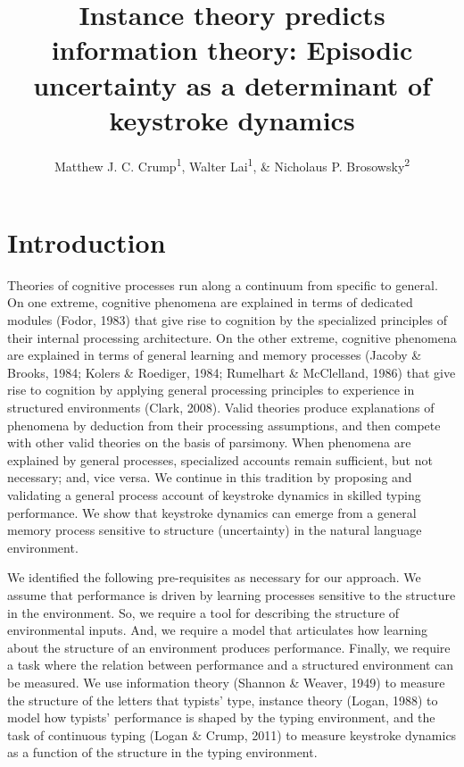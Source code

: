 \documentclass[,man,floatsintext]{apa6}
\title{Instance theory predicts information theory: Episodic uncertainty as a determinant of keystroke dynamics}
\author{Matthew J. C. Crump\textsuperscript{1}, Walter Lai\textsuperscript{1}, \& Nicholaus P. Brosowsky\textsuperscript{2}}
\date{}
\affiliation{
\vspace{0.5cm}
\textsuperscript{1} Brooklyn College of the City University of New York\\\textsuperscript{2} The Graduate Center of the City University of New York}
\begin{document}
\maketitle

\hypertarget{introduction}{%
\section{Introduction}\label{introduction}}

Theories of cognitive processes run along a continuum from specific to general. On one extreme, cognitive phenomena are explained in terms of dedicated modules (Fodor, 1983) that give rise to cognition by the specialized principles of their internal processing architecture. On the other extreme, cognitive phenomena are explained in terms of general learning and memory processes (Jacoby \& Brooks, 1984; Kolers \& Roediger, 1984; Rumelhart \& McClelland, 1986) that give rise to cognition by applying general processing principles to experience in structured environments (Clark, 2008). Valid theories produce explanations of phenomena by deduction from their processing assumptions, and then compete with other valid theories on the basis of parsimony. When phenomena are explained by general processes, specialized accounts remain sufficient, but not necessary; and, vice versa. We continue in this tradition by proposing and validating a general process account of keystroke dynamics in skilled typing performance. We show that keystroke dynamics can emerge from a general memory process sensitive to structure (uncertainty) in the natural language environment.

We identified the following pre-requisites as necessary for our approach. We assume that performance is driven by learning processes sensitive to the structure in the environment. So, we require a tool for describing the structure of environmental inputs. And, we require a model that articulates how learning about the structure of an environment produces performance. Finally, we require a task where the relation between performance and a structured environment can be measured. We use information theory (Shannon \& Weaver, 1949) to measure the structure of the letters that typists' type, instance theory (Logan, 1988) to model how typists' performance is shaped by the typing environment, and the task of continuous typing (Logan \& Crump, 2011) to measure keystroke dynamics as a function of the structure in the typing environment.
\end{document}
